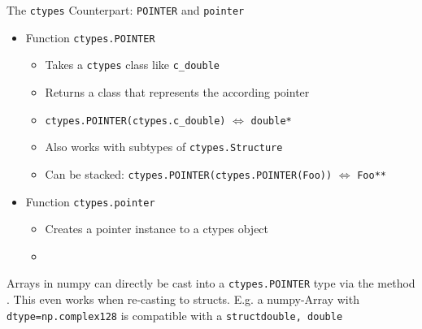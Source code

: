 \begin{frame}{The \texttt{ctypes} Counterpart: \texttt{POINTER} and \texttt{pointer}}
%
\begin{itemize}
\item Function \texttt{ctypes.POINTER}
	\begin{itemize}
	\item Takes a \texttt{ctypes} class like \texttt{c\_double}
	\item Returns a class that represents the according pointer
	\item[\Thus] \texttt{ctypes.POINTER(ctypes.c\_double)} $\Leftrightarrow$ \texttt{double*}
	\item Also works with subtypes of \texttt{ctypes.Structure}
	\item Can be stacked: \texttt{ctypes.POINTER(ctypes.POINTER(Foo))} $\Leftrightarrow$ \texttt{Foo**}
	\end{itemize}
\item Function \texttt{ctypes.pointer}
	\begin{itemize}
	\item Creates a pointer instance to a ctypes object
	\item {}
	\end{itemize}
\end{itemize}
%
\begin{hintbox}
\footnotesize
Arrays in numpy can directly be cast into a \texttt{ctypes.POINTER} type via the method . This even works when re-casting to structs. E.\;g. a numpy-Array with \texttt{dtype=np.complex128} is compatible with a \texttt{struct{double, double}}
\end{hintbox}
%
\end{frame}


